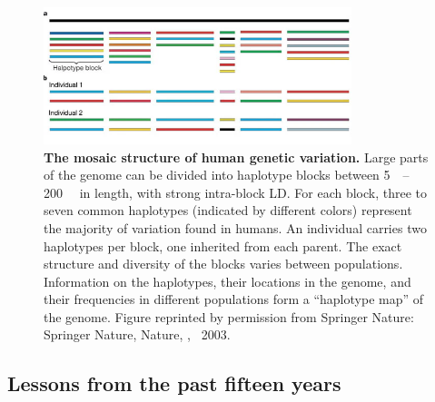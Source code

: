 \begin{outline}
\begin{figure}
    \centering
    \includegraphics[width=0.8\textwidth,page=1]{mainmatter/figures/chapter_01/paabo2003MosaicThatOur/41586_2003_Article_BFnature01400_Fig3_HTML.png}
    \caption{
        \textbf{The mosaic structure of human genetic variation.}
        Large parts of the genome can be divided into haplotype blocks between \SIrange{5}{200}{\kilo\bp} in length, with strong intra-block \gls{LD}.
        For each block, three to seven common haplotypes (indicated by different colors) represent the majority of variation found in humans.
        An individual carries two haplotypes per block, one inherited from each parent.
        The exact structure and diversity of the blocks varies between populations.
        Information on the haplotypes, their locations in the genome, and their frequencies in different populations form a \enquote{haplotype map} of the genome.
        Figure reprinted by permission from Springer Nature: Springer Nature, Nature, \textcite{paabo2003MosaicThatOur}, \textcopyright~2003.
    }
    \label{fig:intro_haplotypeBlocks}
\end{figure}

\subsection{Lessons from the past fifteen years}


\end{outline}
